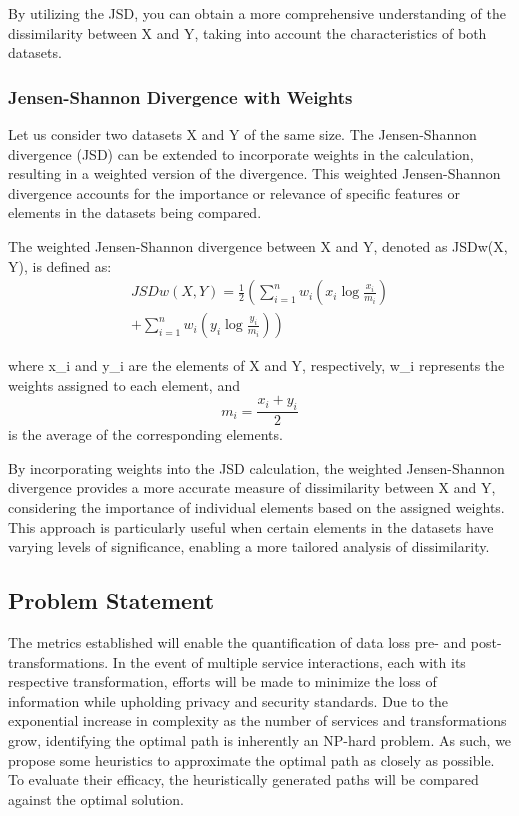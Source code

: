 By utilizing the JSD, you can obtain a more comprehensive understanding of the dissimilarity between X and Y, taking into account the characteristics of both datasets.

\subsubsection{Jensen-Shannon Divergence with Weights}

Let us consider two datasets X and Y of the same size. The Jensen-Shannon divergence (JSD) can be extended to incorporate weights in the calculation, resulting in a weighted version of the divergence. This weighted Jensen-Shannon divergence accounts for the importance or relevance of specific features or elements in the datasets being compared.

The weighted Jensen-Shannon divergence between X and Y, denoted as JSDw(X, Y), is defined as:
\begin{align*}
  JSDw(X, Y) = \frac{1}{2} \left( \sum_{i=1}^{n} w_i \left( x_i \log \frac{x_i}{m_i} \right) \right. \\
  \left. + \sum_{i=1}^{n} w_i \left( y_i \log \frac{y_i}{m_i} \right) \right)
\end{align*}

where x\_i and y\_i are the elements of X and Y, respectively, w\_i represents the weights assigned to each element, and \[m_i = \frac{{x_i + y_i}}{2}\] is the average of the corresponding elements.

By incorporating weights into the JSD calculation, the weighted Jensen-Shannon divergence provides a more accurate measure of dissimilarity between X and Y, considering the importance of individual elements based on the assigned weights. This approach is particularly useful when certain elements in the datasets have varying levels of significance, enabling a more tailored analysis of dissimilarity.

\subsection{Problem Statement}
The metrics established will enable the quantification of data loss pre- and post-transformations.
In the event of multiple service interactions, each with its respective transformation, efforts will be made to minimize the loss of information while upholding privacy and security standards.
Due to the exponential increase in complexity as the number of services and transformations grow, identifying the optimal path is inherently an NP-hard problem.
As such, we propose some heuristics to approximate the optimal path as closely as possible.
To evaluate their efficacy, the heuristically generated paths will be compared against the optimal solution.
